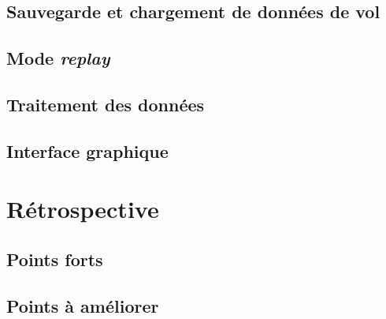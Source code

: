 \subsection{Sauvegarde et chargement de données de vol}


\subsection{Mode \textit{replay}}
\label{s:mode_replay}


\subsection{Traitement des données}
\label{s:traitement}


\subsection{Interface graphique}


\section{Rétrospective}

\subsection{Points forts}


\subsection{Points à améliorer}
